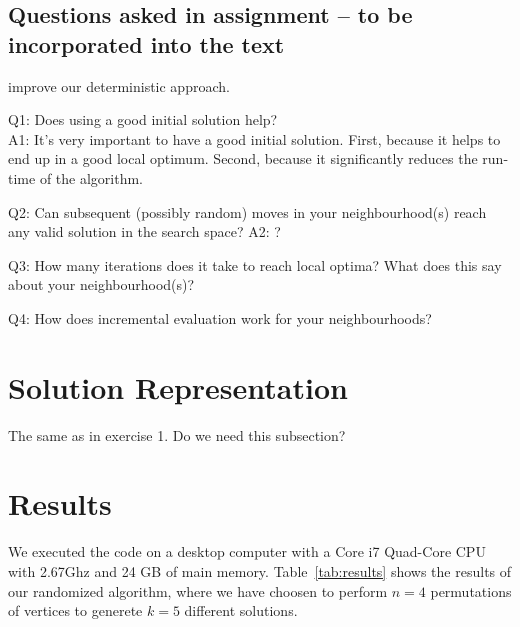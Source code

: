 \documentclass{scrartcl}
\begin{document}
\subsection{Questions asked in assignment -- to be incorporated into the text}


improve our deterministic approach.

Q1: Does using a good initial solution help? \\
A1: It's very important to have a good initial solution. First, because it helps to end up
in a good local optimum. Second, because it significantly reduces the run-time of the algorithm.

Q2: Can subsequent (possibly random) moves in your neighbourhood(s) reach
any valid solution in the search space?
A2: ?

Q3: How many iterations does it take to reach local optima? What does this say about your neighbourhood(s)?

Q4: How does incremental evaluation work for your neighbourhoods?



\section{Solution Representation}
The same as in exercise 1. Do we need this subsection?

\section{Results}
We executed the code on a desktop computer with a Core i7 Quad-Core
CPU with 2.67Ghz and 24 GB of main memory. Table~\ref{tab:results}
shows the results of our randomized algorithm, where we have choosen
to perform $n=4$ permutations of vertices to generete $k=5$ different
solutions.
\end{document}
